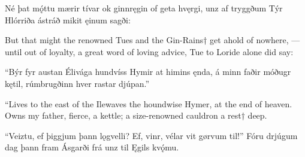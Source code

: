 Né þat mǫ́ttu \hld mærir tívar
ok ginnręgin \hld of geta hvęrgi,
unz af tryggðum \hld Týr Hlórriða
ástráð mikit \hld ęinum sagði:

But that might the renowned Tues and the Gin-Rains† get ahold of nowhere, — until out of loyalty, a great word of loving advice, Tue to Loride alone did say:

“Býr fyr austan \hld Élivága
hundvíss Hymir \hld at himins ęnda,
á minn faðir \hld móðugr kętil,
rúmbrugðinn hver \hld rastar djúpan.”

“Lives to the east of the Ilewaves the houndwise Hymer, at the end of heaven. Owns my father\footnotemark[1], fierce, a kettle; a size-renowned cauldron a rest† deep.

“Veiztu, ef þiggjum \hld þann lǫgvelli?
Ef, vinr, vélar \hld vit gørvum til!”
Fóru drjúgum \hld dag þann fram
Ásgarði frá \hld unz til Ęgils kvǫ́mu. 
